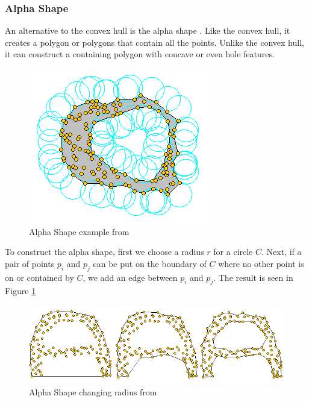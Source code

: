 
\subsubsection{Alpha Shape}

An alternative to the convex hull is the alpha shape \cite{Edelsbrunner:1983p772}.  Like the convex hull, it creates a polygon or polygons that contain all the points.  Unlike the convex hull, it can construct a containing polygon with concave or even hole features.  

\begin{figure}
  \begin{center}
    \includegraphics[scale=0.7]{alphashape.png}
  \end{center}
  \caption{Alpha Shape example from \cite{cgal:d-as2-12b}}
	\label{alpha_cgal}
\end{figure}

To construct the alpha shape, first we choose a radius $r$ for a circle $C$.  Next, if a pair of points $p_i$ and $p_j$ can be put on the boundary of $C$ where no other point is on or contained by $C$, we add an edge between $p_i$ and $p_j$.  The result is seen in Figure \ref{alpha_cgal}

\begin{figure}
  \begin{center}
    \includegraphics[scale=0.6]{4_alpha_radius.png}
  \end{center}
  \caption{Alpha Shape changing radius from \cite{cgal:d-as2-12b}}
	\label{alpha_cgal2}
\end{figure}

